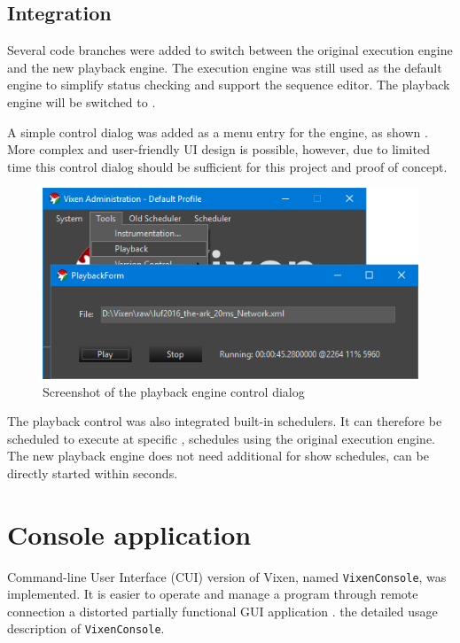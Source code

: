 \subsection{Integration}

Several code branches were added to switch between the original execution engine and the new playback engine. The execution engine was still used as the default engine to simplify status checking and support the sequence editor. The playback engine will be switched to .

A simple control dialog was added as a menu entry for the  engine, as shown  . More complex and user-friendly UI design is possible, however, due to limited time  this control dialog should be sufficient for this project and proof of concept.

\begin{figure}[t]
  \centering
  \includegraphics[width=0.8\columnwidth]{Figs/vixen_playback.png}
  \caption{\footnotesize Screenshot of the playback engine control dialog}
  \label{fig:vixen_playback}
\end{figure}

The playback control was also integrated  built-in schedulers. It can therefore be scheduled to execute at specific ,   schedules using the original execution engine. The new playback engine does not need additional  for show schedules,  can be directly started within seconds.

\section{Console application}

 Command-line User Interface (CUI) version of Vixen, named \texttt{VixenConsole}, was implemented. It is easier to operate and manage a  program through  remote connection   a distorted partially functional GUI application .   the detailed usage description of \texttt{VixenConsole}.

